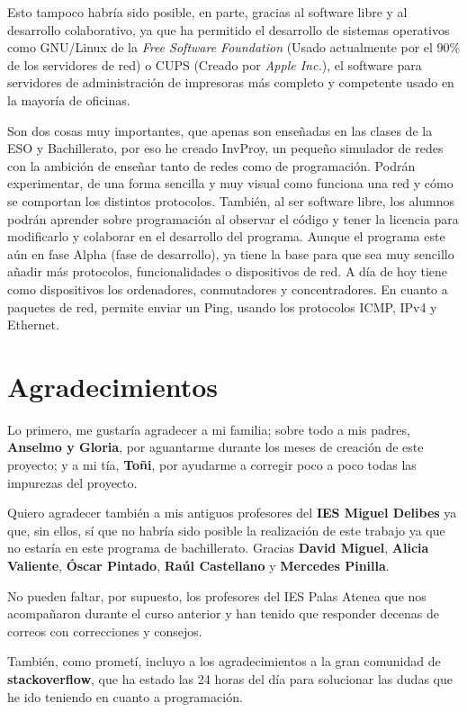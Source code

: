 \documentclass[a4paper, 11pt]{report} %
\begin{document}
Esto tampoco habría sido posible, en parte, gracias al software libre y al desarrollo colaborativo, ya que ha permitido el desarrollo de sistemas operativos como GNU/Linux de la \textit{Free Software Foundation} (Usado actualmente por el 90\% de los servidores de red) o CUPS (Creado por \textit{Apple Inc.}), el software para servidores de administración de impresoras más completo y competente usado en la mayoría de oficinas.

Son dos cosas muy importantes, que apenas son enseñadas en las clases de la ESO y Bachillerato, por eso he creado InvProy, un pequeño simulador de redes con la ambición de enseñar tanto de redes como de programación. Podrán experimentar, de una forma sencilla y muy visual como funciona una red y cómo se comportan los distintos protocolos. También, al ser software libre, los alumnos podrán aprender sobre programación al observar el código y tener la licencia para modificarlo y colaborar en el desarrollo del programa. Aunque el programa este aún en fase Alpha (fase de desarrollo), ya tiene la base para que sea muy sencillo añadir más protocolos, funcionalidades o dispositivos de red. A día de hoy tiene como dispositivos los ordenadores, conmutadores y concentradores. En cuanto a paquetes de red, permite enviar un Ping, usando los protocolos ICMP, IPv4 y Ethernet. 



\chapter*{Agradecimientos}
Lo primero, me gustaría agradecer a mi familia; sobre todo a mis padres, \textbf{Anselmo y Gloria}, por aguantarme durante los meses de creación de este proyecto; y a mi tía, \textbf{Toñi}, por ayudarme a corregir poco a poco todas las impurezas del proyecto.

Quiero agradecer también a mis antiguos profesores del \textbf{IES Miguel Delibes} ya que, sin ellos, sí que no habría sido posible la realización de este trabajo ya que no estaría en este programa de bachillerato. Gracias \textbf{David Miguel}, \textbf{Alicia Valiente}, \textbf{Óscar Pintado}, \textbf{Raúl Castellano} y \textbf{Mercedes Pinilla}.

No pueden faltar, por supuesto, los profesores del IES Palas Atenea que nos acompañaron durante el curso anterior y han tenido que responder decenas de correos con correcciones y consejos.

También, como prometí, incluyo a los agradecimientos a la gran comunidad de \textbf{stackoverflow}, que ha estado las 24 horas del día para solucionar las dudas que he ido teniendo en cuanto a programación.
\end{document}
